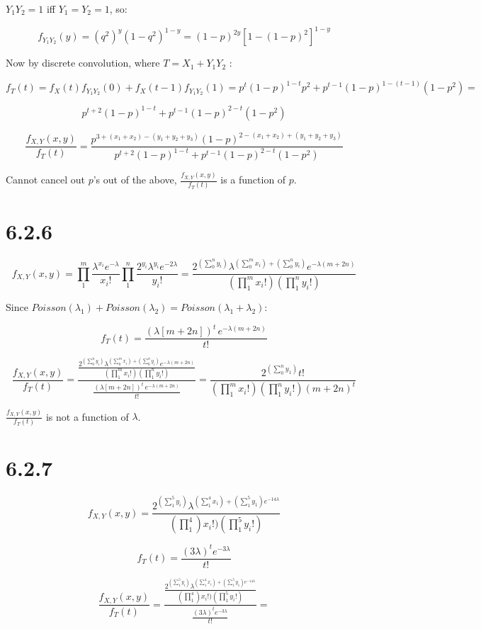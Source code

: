 \documentclass{article}
\begin{document}
$Y_1Y_2 = 1$ iff $Y_1 = Y_2 = 1$, so:

\[
f_{Y_1Y_2}(y) = (q^2)^y(1-q^2)^{1-y} = (1-p)^{2y} \left[ 1-(1-p)^2 \right]^{1-y}
\]

Now by discrete convolution, where $T = X_1+Y_1Y_2$ :

\[
f_T(t) = f_X(t)f_{Y_1Y_2}(0) + f_X(t-1)f_{Y_1Y_2}(1) = p^t(1-p)^{1-t}p^2 +
p^{t-1}(1-p)^{1-(t-1)}(1-p^2) =
\]

\[
p^{t+2}(1-p)^{1-t}+p^{t-1}(1-p)^{2-t}(1-p^2)
\]

\[
\frac{f_{X,Y}(x,y)}{f_T(t)} = \frac{p^{3+(x_1+x_2)-(y_1+y_2+y_3)}(1-p)^
{2-(x_1+x_2)+(y_1+y_2+y_3)}} {p^{t+2}(1-p)^{1-t}+p^{t-1}(1-p)^{2-t}(1-p^2)}
\]

Cannot cancel out $p$'s out of the above, $\frac{f_{X,Y}(x,y)}{f_T(t)}$ is a
function of $p$.

\section{6.2.6}
\[
f_{X,Y}(x,y) = \prod_1^m \frac{\lambda^{x_i}e^{-\lambda}}{x_i!}
\prod_1^n \frac{2^{y_i}\lambda^{y_i}e^{-2\lambda}}{y_i!} =
\frac{2^{(\sum_0^n y_i)}\lambda^{(\sum_0^m x_i) + (\sum_0^n y_i)}e^{-\lambda(m+2n)}}
{(\prod_1^m x_i!)(\prod_1^n y_i!)}
\]

Since $Poisson(\lambda_1) + Poisson(\lambda_2) = Poisson(\lambda_1+\lambda_2)$:

\[
f_T(t) = \frac{(\lambda[m+2n])^t \hspace{2pt} e^{-\lambda(m+2n)}}{t!}
\]

\[
\frac{f_{X,Y}(x,y)}{f_T(t)} = \frac{\frac{2^{(\sum_0^n y_i)}\lambda^{(\sum_0^m x_i) + (\sum_0^n y_i)}e^{-\lambda(m+2n)}}{(\prod_1^m x_i!)(\prod_1^n y_i!)}}
{\frac{(\lambda[m+2n])^t \hspace{2pt} e^{-\lambda(m+2n)}}{t!}} =
\frac{2^{(\sum_0^n y_1)}t!}{(\prod_1^m x_i!)(\prod_1^n y_i!)(m+2n)^t}
\]

$\frac{f_{X,Y}(x,y)}{f_T(t)}$ is not a function of $\lambda$.

\section{6.2.7}
\[
f_{X,Y}(x,y) = \frac{2^{(\sum_1^5 y_i)} \lambda^{(\sum_1^4 x_i) + (\sum_1^5 y_1)e^{-14\lambda}}}
{(\prod_1^4) x_i!)(\prod_1^5 y_i!)}
\]

\[
f_T(t) = \frac{(3\lambda)^t e^{-3\lambda}}{t!}
\]

\[
\frac{f_{X,Y}(x,y)}{f_T(t)} = \frac{\frac{2^{(\sum_1^5 y_i)} \lambda^{(\sum_1^4 x_i) + (\sum_1^5 y_1)e^{-14\lambda}}} {(\prod_1^4) x_i!)(\prod_1^5 y_i!)}}
{\frac{(3\lambda)^t e^{-3\lambda}}{t!}} =
\]
\end{document}
